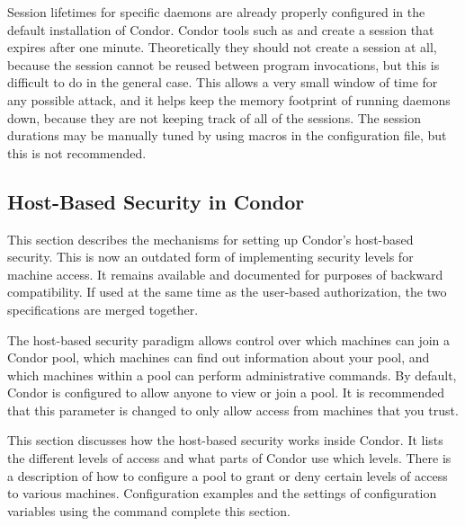 Session lifetimes for specific daemons are already properly configured in the default installation
of Condor.
Condor tools such as  and  create a
session that expires after one minute. 
Theoretically they should not create a session at all,
because the
session cannot be reused between program invocations, but this is
difficult to do in the general case.
This allows a very small window of time for any possible attack,
and it helps
keep the memory footprint of running daemons down,
because they are not keeping track of all of the sessions.
The session durations may be manually tuned
by using macros in the configuration file,
but this is not recommended.


\subsection{\label{sec:Host-Security}Host-Based Security in
Condor} 

This section describes the mechanisms for setting up Condor's
host-based security.
This is now an outdated form of implementing security
levels for machine access.
It remains available and documented for purposes of backward compatibility.
If used at the same time as the user-based authorization,
the two specifications are merged together.

The host-based security paradigm allows control over which machines can
join a Condor pool, which machines can find out information about
your pool, and which machines within a pool can perform
administrative commands.  By default, Condor is configured to allow
anyone to view or join a pool. It is recommended that this parameter is changed
to only allow access from machines that you trust.

This section discusses how the host-based security works inside Condor.
It lists the different levels of access and what
parts of Condor use which levels.
There is a description of how to configure
a pool to grant or deny certain levels of access to various
machines.
Configuration examples and the settings of configuration variables
using the  command complete this section.

